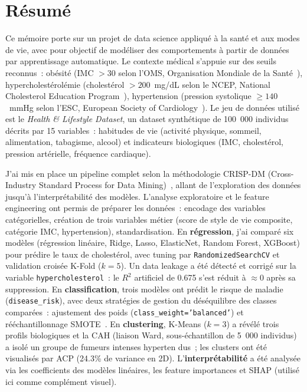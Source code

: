 
\section*{Résumé}

Ce mémoire porte sur un projet de data science appliqué à la santé et aux modes de vie, avec pour objectif de modéliser des comportements à partir de données par apprentissage automatique. Le contexte médical s'appuie sur des seuils reconnus~: obésité (IMC $> 30$ selon l'OMS, Organisation Mondiale de la Santé~\cite{who2000}), hypercholestérolémie (cholestérol $> 200$~mg/dL selon le NCEP, National Cholesterol Education Program~\cite{ncep2002}), hypertension (pression systolique $\geq 140$~mmHg selon l'ESC, European Society of Cardiology~\cite{esc2018}). Le jeu de données utilisé est le \textit{Health \& Lifestyle Dataset}, un dataset synthétique de 100~000 individus décrits par 15 variables~: habitudes de vie (activité physique, sommeil, alimentation, tabagisme, alcool) et indicateurs biologiques (IMC, cholestérol, pression artérielle, fréquence cardiaque).

J'ai mis en place un pipeline complet selon la méthodologie CRISP-DM (Cross-Industry Standard Process for Data Mining)~\cite{chapman2000}, allant de l'exploration des données jusqu'à l'interprétabilité des modèles. L'analyse exploratoire et le feature engineering ont permis de préparer les données~: encodage des variables catégorielles, création de trois variables métier (score de style de vie composite, catégorie IMC, hypertension), standardisation. En \textbf{régression}, j'ai comparé six modèles (régression linéaire, Ridge, Lasso, ElasticNet, Random Forest, XGBoost) pour prédire le taux de cholestérol, avec tuning par \texttt{RandomizedSearchCV} et validation croisée K-Fold ($k=5$). Un data leakage a été détecté et corrigé sur la variable \texttt{hypercholesterol}~: le $R^2$ artificiel de 0.675 s'est réduit à $\approx 0$ après sa suppression. En \textbf{classification}, trois modèles ont prédit le risque de maladie (\texttt{disease\_risk}), avec deux stratégies de gestion du déséquilibre des classes comparées~: ajustement des poids (\texttt{class\_weight='balanced'}) et rééchantillonnage SMOTE~\cite{chawla2002}. En \textbf{clustering}, K-Means ($k=3$) a révélé trois profils biologiques et la CAH (liaison Ward, sous-échantillon de 5~000 individus) a isolé un groupe de fumeurs intenses hyperten dus~; les clusters ont été visualisés par ACP (24.3\% de variance en 2D). L'\textbf{interprétabilité} a été analysée via les coefficients des modèles linéaires, les feature importances et SHAP (utilisé ici comme complément visuel).

